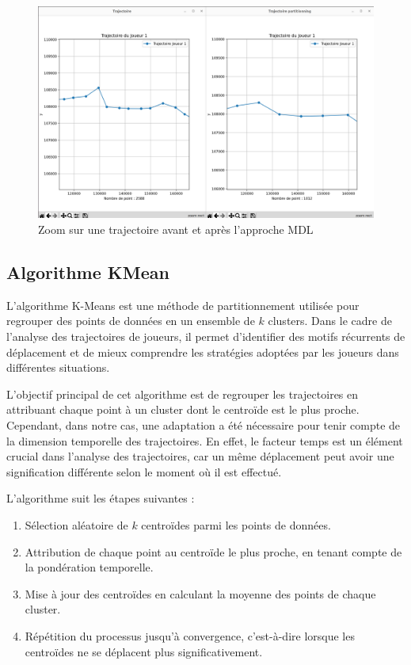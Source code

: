 \documentclass{article}
\begin{document}
        \begin{figure}[htbp]
            \centering
            \includegraphics[scale=0.12]{img/etat2.png}
            \caption{Zoom sur une trajectoire avant et après l'approche MDL}
            \label{test_mdl_zoom}
        \end{figure}

    \subsection{Algorithme KMean}
        L’algorithme K-Means est une méthode de partitionnement utilisée pour regrouper des points de données en un ensemble de $k$ clusters. Dans le cadre de l’analyse des trajectoires de joueurs, il permet d’identifier des motifs récurrents de déplacement et de mieux comprendre les stratégies adoptées par les joueurs dans différentes situations.
        
        L’objectif principal de cet algorithme est de regrouper les trajectoires en attribuant chaque point à un cluster dont le centroïde est le plus proche. Cependant, dans notre cas, une adaptation a été nécessaire pour tenir compte de la dimension temporelle des trajectoires. En effet, le facteur temps est un élément crucial dans l’analyse des trajectoires, car un même déplacement peut avoir une signification différente selon le moment où il est effectué.
        
        L’algorithme suit les étapes suivantes :
        
        \begin{enumerate}
            \item Sélection aléatoire de $k$ centroïdes parmi les points de données.
            \item Attribution de chaque point au centroïde le plus proche, en tenant compte de la pondération temporelle.
            \item Mise à jour des centroïdes en calculant la moyenne des points de chaque cluster.
            \item Répétition du processus jusqu’à convergence, c’est-à-dire lorsque les centroïdes ne se déplacent plus significativement.
        \end{enumerate}
        
\end{document}
